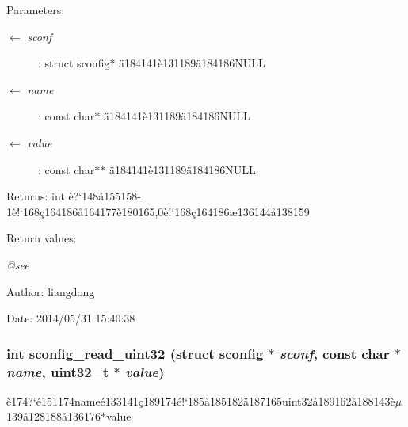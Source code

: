 \begin{Desc}
\item[Parameters:]
\begin{description}
\item[\mbox{$\leftarrow$} {\em sconf}]: struct sconfig$\ast$ \"{a}184141\`{e}131189\"{a}184186NULL \item[\mbox{$\leftarrow$} {\em name}]: const char$\ast$ \"{a}184141\`{e}131189\"{a}184186NULL \item[\mbox{$\leftarrow$} {\em value}]: const char$\ast$$\ast$ \"{a}184141\`{e}131189\"{a}184186NULL \end{description}
\end{Desc}
\begin{Desc}
\item[Returns:]int \`{e}?`148\aa{}155158-1\`{e}!`168\c{c}164186\aa{}164177\`{e}180165,0\`{e}!`168\c{c}164186\ae{}136144\aa{}138159 \end{Desc}
\begin{Desc}
\item[Return values:]
\begin{description}
\item[{\em @see}]\end{description}
\end{Desc}
\begin{Desc}
\item[Author:]liangdong \end{Desc}
\begin{Desc}
\item[Date:]2014/05/31 15:40:38 \end{Desc}
\subsubsection{\setlength{\rightskip}{0pt plus 5cm}int sconfig\_\-read\_\-uint32 (struct sconfig $\ast$ {\em sconf}, const char $\ast$ {\em name}, uint32\_\-t $\ast$ {\em value})}\label{sconfig_8h_a5}


\`{e}174?`\'{e}151174name\'{e}133141\c{c}189174\'{e}!`185\aa{}185182\"{a}187165uint32\aa{}189162\aa{}188143\`{e}$\mu$139\aa{}128188\aa{}136176$\ast$value 

